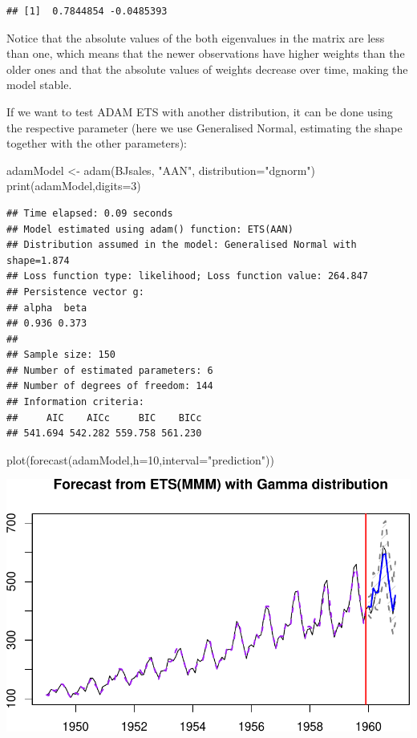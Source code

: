 \documentclass[
]{book}
\newenvironment{Shaded}{\begin{snugshade}}{\end{snugshade}}
\newcommand{\AttributeTok}[1]{\textcolor[rgb]{0.77,0.63,0.00}{#1}}
\newcommand{\DecValTok}[1]{\textcolor[rgb]{0.00,0.00,0.81}{#1}}
\newcommand{\FunctionTok}[1]{\textcolor[rgb]{0.00,0.00,0.00}{#1}}
\newcommand{\NormalTok}[1]{#1}
\newcommand{\OtherTok}[1]{\textcolor[rgb]{0.56,0.35,0.01}{#1}}
\newcommand{\StringTok}[1]{\textcolor[rgb]{0.31,0.60,0.02}{#1}}
\theoremstyle{definition}
\theoremstyle{definition}
\theoremstyle{definition}
\theoremstyle{definition}
\theoremstyle{remark}
\begin{document}
\begin{verbatim}
## [1]  0.7844854 -0.0485393
\end{verbatim}

Notice that the absolute values of the both eigenvalues in the matrix are less than one, which means that the newer observations have higher weights than the older ones and that the absolute values of weights decrease over time, making the model stable.

If we want to test ADAM ETS with another distribution, it can be done using the respective parameter (here we use Generalised Normal, estimating the shape together with the other parameters):

\begin{Shaded}
\begin{Highlighting}[]
\NormalTok{adamModel }\OtherTok{\textless{}{-}} \FunctionTok{adam}\NormalTok{(BJsales, }\StringTok{"AAN"}\NormalTok{, }\AttributeTok{distribution=}\StringTok{"dgnorm"}\NormalTok{)}
\FunctionTok{print}\NormalTok{(adamModel,}\AttributeTok{digits=}\DecValTok{3}\NormalTok{)}
\end{Highlighting}
\end{Shaded}

\begin{verbatim}
## Time elapsed: 0.09 seconds
## Model estimated using adam() function: ETS(AAN)
## Distribution assumed in the model: Generalised Normal with shape=1.874
## Loss function type: likelihood; Loss function value: 264.847
## Persistence vector g:
## alpha  beta 
## 0.936 0.373 
## 
## Sample size: 150
## Number of estimated parameters: 6
## Number of degrees of freedom: 144
## Information criteria:
##     AIC    AICc     BIC    BICc 
## 541.694 542.282 559.758 561.230
\end{verbatim}

\begin{Shaded}
\begin{Highlighting}[]
\FunctionTok{plot}\NormalTok{(}\FunctionTok{forecast}\NormalTok{(adamModel,}\AttributeTok{h=}\DecValTok{10}\NormalTok{,}\AttributeTok{interval=}\StringTok{"prediction"}\NormalTok{))}
\end{Highlighting}
\end{Shaded}

\includegraphics{adam_files/figure-latex/unnamed-chunk-36-1.pdf}
\end{document}
